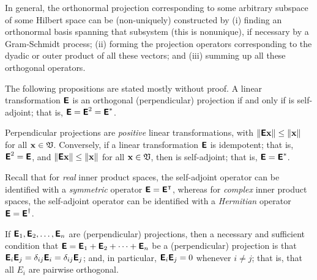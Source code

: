 In general, the orthonormal projection corresponding to some arbitrary subspace of some Hilbert space can be (non-uniquely)
constructed by
(i) finding an orthonormal basis spanning that subsystem (this is nonunique),
if necessary by a Gram-Schmidt process;
(ii) forming the projection operators corresponding to the dyadic or outer product
of all these vectors; and
(iii) summing up all these orthogonal operators.


The following propositions are stated mostly without proof.
A  linear transformation $\textsf{\textbf{E}}$ is an orthogonal (perpendicular) projection
if and only if is self-adjoint; that is,
$\textsf{\textbf{E}} = \textsf{\textbf{E}}^2=\textsf{\textbf{E}}^\ast $.

Perpendicular projections are {\em positive} linear transformations,
with
$\left\| \textsf{\textbf{E}}{\bf x} \right\| \le \| {\bf x} \|$
for all
${\bf x} \in {\frak V}$.
Conversely,
if a linear transformation $\textsf{\textbf{E}}$
is idempotent; that is,
$\textsf{\textbf{E}}^2=\textsf{\textbf{E}}$,
and  $\left\| \textsf{\textbf{E}}{\bf x} \right\| \le \| {\bf x} \|$
for all
${\bf x} \in {\frak V}$,
then  is self-adjoint; that is,
$\textsf{\textbf{E}}=\textsf{\textbf{E}}^\ast$.

Recall that
for {\em real} inner product spaces, the self-adjoint operator can be identified with a {\em symmetric} operator
$\textsf{\textbf{E}}=\textsf{\textbf{E}}^\intercal $,
whereas
for {\em complex} inner product spaces, the self-adjoint operator can be identified with a {\em Hermitian} operator
$\textsf{\textbf{E}}=\textsf{\textbf{E}}^\dagger$.


If $\textsf{\textbf{E}}_1,\textsf{\textbf{E}}_2, \ldots , \textsf{\textbf{E}}_n$ are (perpendicular)
projections,
then a necessary and sufficient condition that
$\textsf{\textbf{E}} =\textsf{\textbf{E}}_1+\textsf{\textbf{E}}_2+\cdots +\textsf{\textbf{E}}_n$
be a (perpendicular) projection is that
 $\textsf{\textbf{E}}_i \textsf{\textbf{E}}_j =\delta_{ij}\textsf{\textbf{E}}_i =\delta_{ij}\textsf{\textbf{E}}_j$;
and, in particular,
$\textsf{\textbf{E}}_i \textsf{\textbf{E}}_j =0$
whenever $i\neq j$; that is, that all $E_i$ are pairwise orthogonal.

